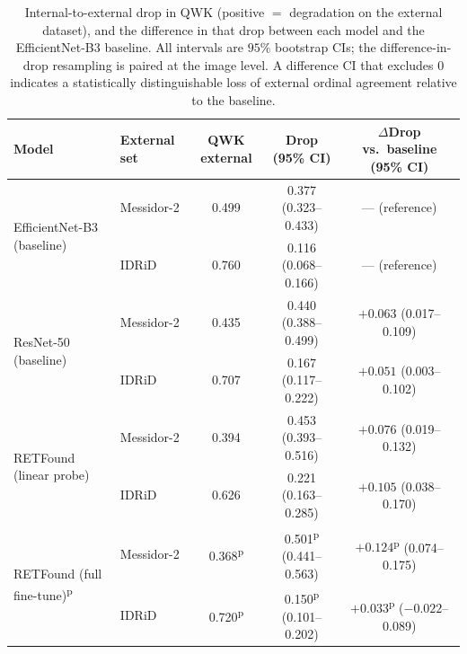 \documentclass[journal]{IEEEtran}
\newcommand{\pv}[1]{#1\textsuperscript{p}}
\begin{document}
\begin{table}[!t]
\centering\footnotesize
\caption{Internal-to-external drop in QWK (positive $=$ degradation on the
external dataset), and the difference in that drop between each model and the
EfficientNet-B3 baseline. All intervals are $95\%$ bootstrap CIs; the
difference-in-drop resampling is paired at the image level. A difference CI that
excludes $0$ indicates a statistically distinguishable loss of external ordinal
agreement relative to the baseline.}
\label{tab:drop}
\setlength{\tabcolsep}{5pt}
\begin{tabular}{llccc}
\toprule
Model & External set & QWK external & Drop (95\% CI) & $\Delta$Drop vs.\ baseline (95\% CI) \\
\midrule
\multirow{2}{*}{EfficientNet-B3 (baseline)}
 & Messidor-2 & 0.499 & 0.377 (0.323--0.433) & --- (reference) \\
 & IDRiD      & 0.760 & 0.116 (0.068--0.166) & --- (reference) \\
\midrule
\multirow{2}{*}{ResNet-50 (baseline)}
 & Messidor-2 & 0.435 & 0.440 (0.388--0.499) & $+0.063$ (0.017--0.109) \\
 & IDRiD      & 0.707 & 0.167 (0.117--0.222) & $+0.051$ (0.003--0.102) \\
\midrule
\multirow{2}{*}{RETFound (linear probe)}
 & Messidor-2 & 0.394 & 0.453 (0.393--0.516) & $+0.076$ (0.019--0.132) \\
 & IDRiD      & 0.626 & 0.221 (0.163--0.285) & $+0.105$ (0.038--0.170) \\
\midrule
\multirow{2}{*}{RETFound (full fine-tune)\textsuperscript{p}}
 & Messidor-2 & \pv{0.368} & \pv{0.501} (0.441--0.563) & \pv{$+0.124$} (0.074--0.175) \\
 & IDRiD      & \pv{0.720} & \pv{0.150} (0.101--0.202) & \pv{$+0.033$} ($-0.022$--0.089) \\
\bottomrule
\end{tabular}
\end{table}
\end{document}
